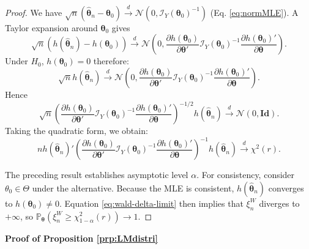 \documentclass[
  11pt,
]{book}
\theoremstyle{definition}
\theoremstyle{definition}
\theoremstyle{definition}
\theoremstyle{definition}
\theoremstyle{remark}
\begin{document}
\begin{proof}
We have \(\sqrt{n}(\hat{\boldsymbol\theta}_{n} - \boldsymbol\theta_{0}) \overset{d}{\rightarrow} \mathcal{N}(0,\mathcal{I}_Y(\boldsymbol\theta_0)^{-1})\) (Eq. \eqref{eq:normMLE}). A Taylor expansion around \(\boldsymbol\theta_0\) gives
\begin{equation}
\sqrt{n}(h(\hat{\boldsymbol\theta}_{n}) - h(\boldsymbol\theta_{0})) \overset{d}{\rightarrow} \mathcal{N}\left(0,\frac{\partial h(\boldsymbol\theta_{0})}{\partial \boldsymbol\theta'}\mathcal{I}_Y(\boldsymbol\theta_0)^{-1}\frac{\partial h(\boldsymbol\theta_{0})'}{\partial \boldsymbol\theta}\right). \label{eq:wald-delta-limit}
\end{equation}
Under \(H_0\), \(h(\boldsymbol\theta_{0})=0\) therefore:
\begin{equation}
\sqrt{n} h(\hat{\boldsymbol\theta}_{n}) \overset{d}{\rightarrow} \mathcal{N}\left(0,\frac{\partial h(\boldsymbol\theta_{0})}{\partial \boldsymbol\theta'}\mathcal{I}_Y(\boldsymbol\theta_0)^{-1}\frac{\partial h(\boldsymbol\theta_{0})'}{\partial \boldsymbol\theta}\right). \label{eq:lm10}
\end{equation}
Hence
\[
\sqrt{n} \left(
\frac{\partial h(\boldsymbol\theta_{0})}{\partial \boldsymbol\theta'}\mathcal{I}_Y(\boldsymbol\theta_0)^{-1}\frac{\partial h(\boldsymbol\theta_{0})'}{\partial \boldsymbol\theta}
\right)^{-1/2} h(\hat{\boldsymbol\theta}_{n}) \overset{d}{\rightarrow} \mathcal{N}\left(0,\mathbf{Id}\right).
\]
Taking the quadratic form, we obtain:
\[
n h(\hat{\boldsymbol\theta}_{n})'  \left(
\frac{\partial h(\boldsymbol\theta_{0})}{\partial \boldsymbol\theta'}\mathcal{I}_Y(\boldsymbol\theta_0)^{-1}\frac{\partial h(\boldsymbol\theta_{0})'}{\partial \boldsymbol\theta}
\right)^{-1} h(\hat{\boldsymbol\theta}_{n}) \overset{d}{\rightarrow} \chi^2(r).
\]

The preceding result establishes asymptotic level \(\alpha\). For consistency, consider \(\theta_0 \in \Theta\) under the alternative. Because the MLE is consistent, \(h(\hat{\boldsymbol\theta}_{n})\) converges to \(h(\boldsymbol\theta_0) \ne 0\). Equation \eqref{eq:wald-delta-limit} then implies that \(\xi^W_n\) diverges to \(+\infty\), so \(\mathbb{P}_{\boldsymbol\theta}(\xi^W_n \ge \chi^2_{1-\alpha}(r)) \rightarrow 1\).
\end{proof}

\textbf{Proof of Proposition \ref{prp:LMdistri}}
\end{document}
